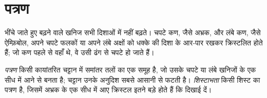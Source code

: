 \section{पत्रण}\label{sec:g12:metamorphic-rocks:foliation}

भींचे जाते हुए बढ़ने वाले खनिज सभी दिशाओं में नहीं बढ़ते। चपटे
कण, जैसे अभ्रक, और लंबे कण, जैसे ऐम्फ़िबोल, अपने
चपटे फलकों या अपने लंबे अक्षों को धक्के की दिशा के आर-पार रखकर क्रिस्टलित होते हैं; जो कण पहले से वहाँ थे, वे उसी
ढंग से चपटे हो जाते हैं।

\begin{definition}[पत्रण; शिस्टाभता]\label{def:g12:metamorphic-rocks:foliation}
\emph{पत्रण} किसी कायांतरित चट्टान में समांतर तलों का एक समूह है, जो
उसके चपटे या लंबे खनिजों के एक सीध में आने से बनता है;
चट्टान उनके अनुदिश सबसे आसानी से फटती है। \emph{शिस्टाभता}
किसी शिस्ट का पत्रण है, जिसमें अभ्रक के एक सीध में आए क्रिस्टल इतने बड़े होते हैं कि
दिखाई दें।
\end{definition}

